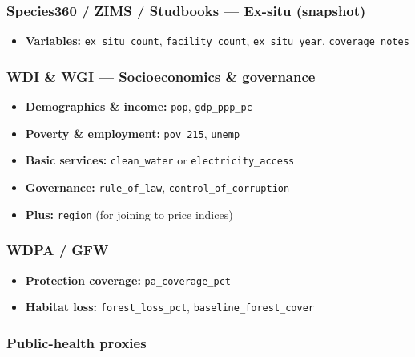 \documentclass[
]{article}
\providecommand{\tightlist}{%
  \setlength{\itemsep}{0pt}\setlength{\parskip}{0pt}}
\begin{document}
\subsubsection{Species360 / ZIMS / Studbooks --- Ex-situ
(snapshot)}\label{species360-zims-studbooks-ex-situ-snapshot}

\begin{itemize}
\tightlist
\item
  \textbf{Variables:} \texttt{ex\_situ\_count},
  \texttt{facility\_count}, \texttt{ex\_situ\_year},
  \texttt{coverage\_notes}
\end{itemize}

\subsubsection{WDI \& WGI --- Socioeconomics \&
governance}\label{wdi-wgi-socioeconomics-governance}

\begin{itemize}
\tightlist
\item
  \textbf{Demographics \& income:} \texttt{pop}, \texttt{gdp\_ppp\_pc}
\item
  \textbf{Poverty \& employment:} \texttt{pov\_215}, \texttt{unemp}
\item
  \textbf{Basic services:} \texttt{clean\_water} or
  \texttt{electricity\_access}
\item
  \textbf{Governance:} \texttt{rule\_of\_law},
  \texttt{control\_of\_corruption}
\item
  \textbf{Plus:} \texttt{region} (for joining to price indices)
\end{itemize}

\subsubsection{WDPA / GFW}\label{wdpa-gfw}

\begin{itemize}
\tightlist
\item
  \textbf{Protection coverage:} \texttt{pa\_coverage\_pct}
\item
  \textbf{Habitat loss:} \texttt{forest\_loss\_pct},
  \texttt{baseline\_forest\_cover}
\end{itemize}

\subsubsection{Public-health proxies}\label{public-health-proxies}
\end{document}
